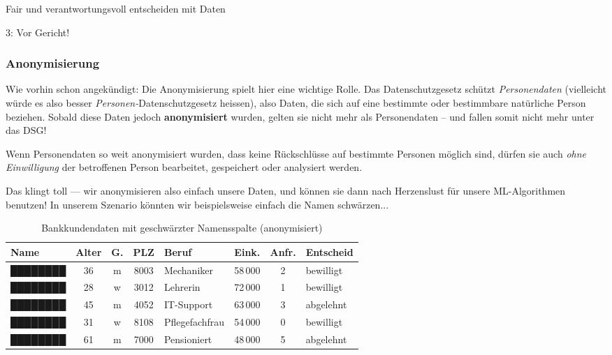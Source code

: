 \begin{lpu}{Fair und verantwortungsvoll entscheiden mit Daten}
\begin{aufgabe}{3: Vor Gericht!}
\end{aufgabe}

\subsubsection*{Anonymisierung}
Wie vorhin schon angekündigt: Die Anonymisierung spielt hier eine wichtige Rolle. Das Datenschutzgesetz schützt \emph{Personendaten} (vielleicht würde es also besser \textit{Personen-}Datenschutzgesetz heissen), also Daten, die sich auf eine bestimmte oder bestimmbare natürliche Person beziehen. Sobald diese Daten jedoch \textbf{anonymisiert} wurden, gelten sie nicht mehr als Personendaten – und fallen somit nicht mehr unter das DSG!

\begin{theorie}
Wenn Personendaten so weit anonymisiert wurden, dass keine Rückschlüsse auf bestimmte Personen möglich sind, dürfen sie auch \emph{ohne Einwilligung} der betroffenen Person bearbeitet, gespeichert oder analysiert werden.
\end{theorie}

Das klingt toll — wir anonymisieren also einfach unsere Daten, und können sie dann nach Herzenslust für unsere ML-Algorithmen benutzen! In unserem Szenario könnten wir beispielsweise einfach die Namen schwärzen...

\begin{table}[h!]
\centering
\begin{tabular}{|l|c|c|c|l|c|c|l|}
\hline
\textbf{Name} & \textbf{Alter} & \textbf{G.} & \textbf{PLZ} & \textbf{Beruf} & \textbf{Eink.} & \textbf{Anfr.} & \textbf{Entscheid} \\
\hline
\cellcolor{black!20}████████ & 36 & m & 8003 & Mechaniker      & 58\,000 & 2 & bewilligt \\
\cellcolor{black!20}████████ & 28 & w & 3012 & Lehrerin        & 72\,000 & 1 & bewilligt \\
\cellcolor{black!20}████████ & 45 & m & 4052 & IT-Support      & 63\,000 & 3 & abgelehnt \\
\cellcolor{black!20}████████ & 31 & w & 8108 & Pflegefachfrau  & 54\,000 & 0 & bewilligt \\
\cellcolor{black!20}████████ & 61 & m & 7000 & Pensioniert     & 48\,000 & 5 & abgelehnt \\
\hline
\end{tabular}
\caption{Bankkundendaten mit geschwärzter Namensspalte (anonymisiert)}
\end{table}


\end{lpu}
